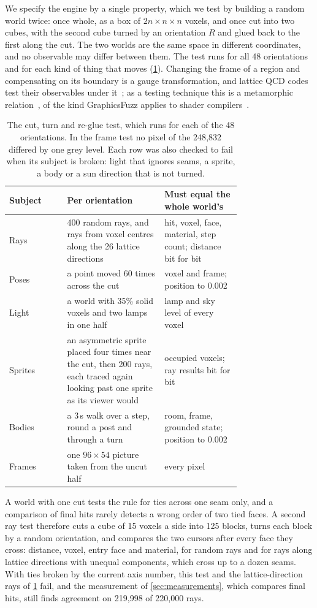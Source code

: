 \documentclass[10pt,a4paper]{article}
\begin{document}
We specify the engine by a single property, which we test by building a random world twice: once
whole, as a box of $2n \times n \times n$ voxels, and once cut into two cubes, with the second cube turned by
an orientation $R$ and glued back to the first along the cut. The two worlds are the same space
in different coordinates, and no observable may differ between them. The test runs for all 48
orientations and for each kind of thing that moves (\cref{tab:tests}). Changing the frame of a
region and compensating on its boundary is a gauge transformation, and lattice QCD codes test
their observables under it~\cite{chroma}; as a testing technique this is a metamorphic
relation~\cite{chen1998}, of the kind GraphicsFuzz applies to shader
compilers~\cite{donaldson2017}.

\begin{table}[t]
\centering
\small
\begin{tabular}{@{}lp{0.42\linewidth}p{0.33\linewidth}@{}}
\toprule
Subject & Per orientation & Must equal the whole world's \\
\midrule
Rays & 400 random rays, and rays from voxel centres along the 26 lattice directions & hit, voxel, face, material, step count; distance bit for bit \\
Poses & a point moved 60 times across the cut & voxel and frame; position to 0.002 \\
Light & a world with 35\% solid voxels and two lamps in one half & lamp and sky level of every voxel \\
Sprites & an asymmetric sprite placed four times near the cut, then 200 rays, each traced again looking past one sprite as its viewer would & occupied voxels; ray results bit for bit \\
Bodies & a 3\,s walk over a step, round a post and through a turn & room, frame, grounded state; position to 0.002 \\
Frames & one $96 \times 54$ picture taken from the uncut half & every pixel \\
\bottomrule
\end{tabular}
\caption{The cut, turn and re-glue test, which runs for each of the 48 orientations. In the frame
test no pixel of the 248{,}832 differed by one grey level. Each row was also checked to fail
when its subject is broken: light that ignores seams, a sprite, a body or a sun direction that is
not turned.}
\label{tab:tests}
\end{table}

A world with one cut tests the rule for ties across one seam only, and a comparison of final
hits rarely detects a wrong order of two tied faces. A second ray test therefore cuts a cube of
15 voxels a side into 125
blocks, turns each block by a random orientation, and compares the two cursors after every face
they cross: distance, voxel, entry face and material, for random rays and for rays along lattice
directions with unequal components, which cross up to a dozen seams. With ties broken by the
current axis number, this test and the lattice-direction rays of \cref{tab:tests} fail, and the
measurement of \cref{sec:measurements}, which compares final hits, still finds agreement on
219{,}998 of 220{,}000 rays.
\end{document}
